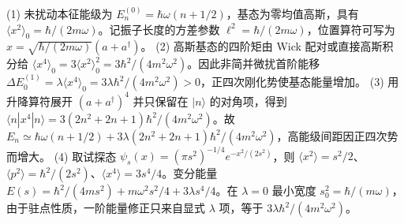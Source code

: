 (1) 未扰动本征能级为 \(E_n^{(0)}=\hbar\omega(n+1/2)\)，基态为零均值高斯，具有 \(\langle x^2\rangle_0=\hbar/(2m\omega)\)。记振子长度的方差参数 \(\ell^2=\hbar/(2m\omega)\)，位置算符可写为 \(x=\sqrt{\hbar/(2m\omega)}(a+a^\dagger)\)。
(2) 高斯基态的四阶矩由 Wick 配对或直接高斯积分给 \(\langle x^4\rangle_0=3\langle x^2\rangle_0^2=3\hbar^2/(4m^2\omega^2)\)。因此非简并微扰首阶能移 \(\Delta E_0^{(1)}=\lambda\langle x^4\rangle_0=3\lambda\hbar^2/(4m^2\omega^2)>0\)，正四次刚化势使基态能量增加。
(3) 用升降算符展开 \((a+a^\dagger)^4\) 并只保留在 \(|n\rangle\) 的对角项，得到 \(\langle n|x^4|n\rangle=3(2n^2+2n+1)\hbar^2/(4m^2\omega^2)\)。故 \(E_n\simeq\hbar\omega(n+1/2)+3\lambda(2n^2+2n+1)\hbar^2/(4m^2\omega^2)\)，高能级间距因正四次势而增大。
(4) 取试探态 \(\psi_s(x)=(\pi s^2)^{-1/4}e^{-x^2/(2s^2)}\)，则 \(\langle x^2\rangle=s^2/2\)、\(\langle p^2\rangle=\hbar^2/(2s^2)\)、\(\langle x^4\rangle=3s^4/4\)。变分能量 \(E(s)=\hbar^2/(4ms^2)+m\omega^2s^2/4+3\lambda s^4/4\)。在 \(\lambda=0\) 最小宽度 \(s_0^2=\hbar/(m\omega)\)，由于驻点性质，一阶能量修正只来自显式 \(\lambda\) 项，等于 \(3\lambda\hbar^2/(4m^2\omega^2)\)。
